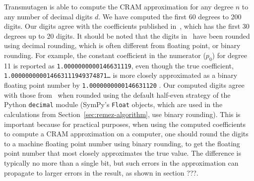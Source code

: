 Transmutagen is able to compute the CRAM approximation for any degree $n$ to
any number of decimal digits $d$. We have computed the first $60$ degrees to
200 digits. Our digits agree with the coefficients published
in~\cite{carpenter1984extended}, which has the first 30 degrees up to 20
digits. It should be noted that the digits in~\cite{carpenter1984extended}
have been rounded using decimal rounding, which is often different from
floating point, or binary rounding. For example, the constant coefficient in
the numerator ($p_0$) for degree 11 is reported as
\texttt{1.0000000000146631119}, even though the true coefficient,
\texttt{1.000000000014663111949374871\ldots} is more closely approximated as a
binary floating point number by \texttt{1.0000000000146631120} . Our computed
digits agree with those from~\cite{carpenter1984extended} when rounded using
the default half-even strategy of the Python \texttt{decimal} module (SymPy's
\texttt{Float} objects, which are used in the calculations from
Section~\ref{sec:remez-algorithm}, use binary rounding). This is important
because for practical purposes, when using the computed coefficients to
compute a CRAM approximation on a computer, one should round the digits to a
machine floating point number using binary rounding, to get the floating point
number that most closely approximates the true value. The difference is
typically no more than a single bit, but such errors in the approximation can
propagate to larger errors in the result, as shown in section
{\color{red}???}. 
